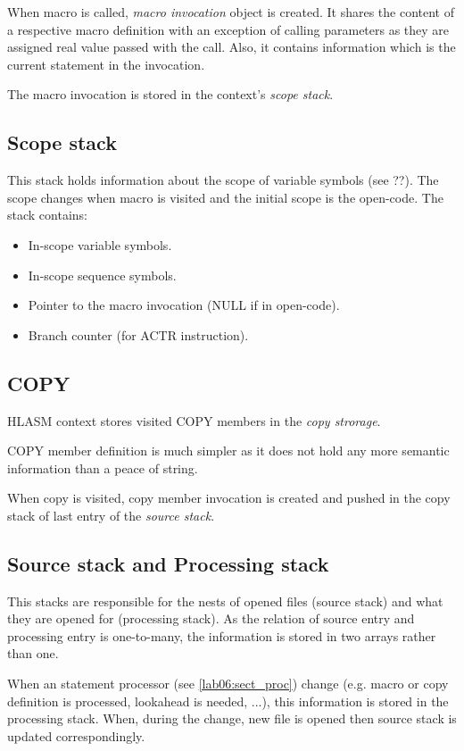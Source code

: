 When macro is called, \emph{macro invocation} object is created. It shares the content of a respective macro definition with an exception of calling parameters as they are assigned real value passed with the call. Also, it contains information which is the current statement in the invocation.

The macro invocation is stored in the context's \emph{scope stack}.

\subsection{Scope stack}

This stack holds information about the scope of variable symbols (see ??). The scope changes when macro is visited and the initial scope is the open-code. 
The stack contains:
\begin{itemize}
	\item In-scope variable symbols.
	\item In-scope sequence symbols.
	\item Pointer to the macro invocation (NULL if in open-code).
	\item Branch counter (for ACTR instruction).
\end{itemize}

\subsection{COPY}

HLASM context stores visited COPY members in the \emph{copy strorage}.

COPY member definition is much simpler as it does not hold any more semantic information than a peace of string.

When copy is visited, copy member invocation is created and pushed in the copy stack of last entry of the \emph{source stack}.

\subsection{Source stack and Processing stack}

This stacks are responsible for the nests of opened files (source stack) and what they are opened for (processing stack). As the relation of source entry and processing entry is one-to-many, the information is stored in two arrays rather than one.

When an statement processor (see \cref{lab06:sect_proc}) change (e.g. macro or copy definition is processed, lookahead is needed, ...), this information is stored in the processing stack. When, during the change, new file is opened then source stack is updated correspondingly.

